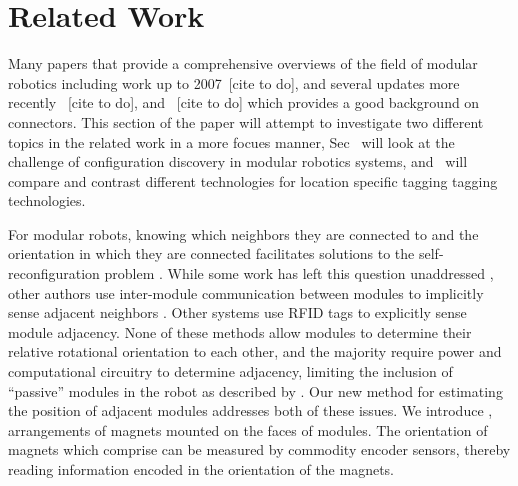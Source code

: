 
\section{Related Work}
\label{sec:RelatedWork}

Many papers that provide a comprehensive overviews of the field of modular robotics including work up to 2007~[cite to do], and several updates more recently ~[cite to do], and ~[cite to do] which provides a good background on connectors. This section of the paper will attempt to investigate two different topics in the related work in a more focues manner, Sec~\label{sec:RWconfiguration} will look at the challenge of configuration discovery in modular robotics systems, and~\label{sec:RWtaggingTech} will compare and contrast different technologies for location specific tagging tagging technologies.

For modular robots, knowing which neighbors they are connected to and the orientation in which they are connected facilitates solutions to the self-reconfiguration problem \cite{AHMADZADEH201527} \cite{Yim-RAM07}. While some work has left this question unaddressed \cite{Soldercubes2016}, other authors use inter-module communication between modules to implicitly sense adjacent neighbors \cite{liedke2013collective} \cite{Gilpin-Thesis06} \cite{TosunDaveyLiuYim-IROS2016}.  Other systems use RFID tags \cite{Werfel-PhDThesis06} to explicitly sense module adjacency.  None of these methods allow modules to determine their relative rotational orientation to each other, and the majority require power and computational circuitry to determine adjacency, limiting the inclusion of ``passive'' modules in the robot as described by \cite{roombots-Bonardi-2013}.  Our new method for estimating the position of adjacent modules addresses both of these issues.  We introduce \tagNamePlural, arrangements of magnets mounted on the faces of modules.  The orientation of magnets which comprise \tagNamePlural can be measured by commodity encoder sensors, thereby reading information encoded in the orientation of the magnets.


